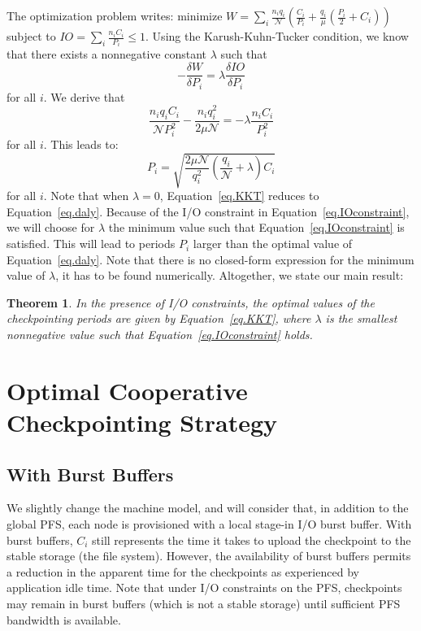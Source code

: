 \documentclass[conference]{IEEEtran}
\newtheorem{theorem}{Theorem}
\newcommand{\nbnodesplat}{{\mathcal N}}
\newcommand{\nbapp}[1]{n_{#1}}
\newcommand{\nbnodes}[1]{q_{#1}}
\newcommand{\period}[1]{P_{#1}}
\newcommand{\ckpt}[1]{C_{#1}}
\newcommand{\mtbfplat}{\mu}
\newcommand{\wasteplat}{W}
\newcommand{\ioconstraint}{\mathit{IO}}
\begin{document}
The optimization problem writes: minimize $\wasteplat = \sum_i \frac{\nbapp{i} \nbnodes{i}}{\nbnodesplat}  \left( \frac{\ckpt{i}}{\period{i}} +
\frac{\nbnodes{i}}{\mtbfplat}(\frac{\period{i}}{2} + \ckpt{i}) \right)$
subject to $\ioconstraint = \sum_{i} \frac{\nbapp{i} \ckpt{i}}{\period{i}} \leq 1$.
Using the Karush-Kuhn-Tucker condition, we know that there exists a nonnegative constant
$\lambda$
such that
$$- \frac{\delta \wasteplat}{\delta \period{i}} = \lambda \frac{\delta\ioconstraint }{\delta \period{i}}$$
for all $i$. We derive that
$$\frac{\nbapp{i} \nbnodes{i} \ckpt{i}}{\nbnodesplat \period{i}^{2}} -    \frac{\nbapp{i} \nbnodes{i}^{2}}{2 \mtbfplat \nbnodesplat} = - \lambda \frac{\nbapp{i} \ckpt{i}}{\period{i}^{2}}
$$
for all $i$. This leads to:
 \begin{equation}
\period{i} = \sqrt{\frac{2 \mtbfplat  \nbnodesplat}{\nbnodes{i}^{2}} \left(\frac{\nbnodes{i}}{\nbnodesplat} +\lambda \right) \ckpt{i}}
  \label{eq.KKT}
\end{equation}
for all $i$. Note that when $\lambda=0$, Equation~\eqref{eq.KKT} reduces to Equation~\eqref{eq.daly}. Because of the I/O constraint in Equation~\eqref{eq.IOconstraint},
we will choose for $\lambda$ the minimum value such that Equation~\eqref{eq.IOconstraint}
  is satisfied. This will lead to periods $P_{i}$ larger than the optimal value of Equation~\eqref{eq.daly}.
  Note that there is no closed-form expression for the minimum value of $\lambda$,
  it has to be found numerically.
   Altogether, we state our main result:

   \begin{theorem}
  In the presence of I/O constraints, the optimal values of the checkpointing periods are given
  by Equation~\eqref{eq.KKT}, where $\lambda$ is the smallest nonnegative value such that
  Equation~\ref{eq.IOconstraint} holds.
\end{theorem}

\section{Optimal Cooperative Checkpointing Strategy}
\label{sec.strategy}

\subsection{With Burst Buffers}

We slightly change the machine model, and will consider that, in addition
to the global PFS, each node is provisioned with a local stage-in I/O
burst buffer. With burst buffers, $\ckpt{i}$ still represents the time it
takes to upload the checkpoint to the stable storage (the file system).
However, the availability of burst buffers permits a reduction in the
apparent time for the checkpoints as experienced by application idle
time. Note that under I/O constraints on the PFS, checkpoints may remain
in burst buffers (which is not a stable storage) until sufficient
PFS bandwidth is available.
\end{document}
